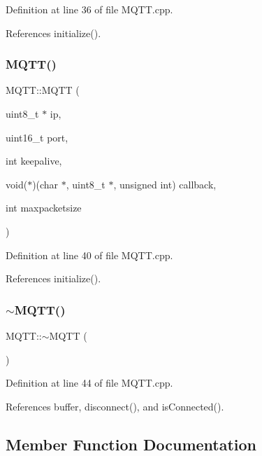 Definition at line 36 of file M\+Q\+T\+T.\+cpp.



References initialize().

\mbox{\label{class_m_q_t_t_a86aa31266ec2193bdd166e9fcd8c9d79}} 
\subsubsection{\texorpdfstring{M\+Q\+T\+T()}{MQTT()}\hspace{0.1cm}{\footnotesize\ttfamily [9/9]}}
{\footnotesize\ttfamily M\+Q\+T\+T\+::\+M\+Q\+TT (\begin{DoxyParamCaption}\item[{uint8\+\_\+t $\ast$}]{ip,  }\item[{uint16\+\_\+t}]{port,  }\item[{int}]{keepalive,  }\item[{void($\ast$)(char $\ast$, uint8\+\_\+t $\ast$, unsigned int)}]{callback,  }\item[{int}]{maxpacketsize }\end{DoxyParamCaption})}



Definition at line 40 of file M\+Q\+T\+T.\+cpp.



References initialize().

\mbox{\label{class_m_q_t_t_a07b8f99719144b5d3bc8d8d817de3e8e}} 
\subsubsection{\texorpdfstring{$\sim$\+M\+Q\+T\+T()}{~MQTT()}}
{\footnotesize\ttfamily M\+Q\+T\+T\+::$\sim$\+M\+Q\+TT (\begin{DoxyParamCaption}{ }\end{DoxyParamCaption})}



Definition at line 44 of file M\+Q\+T\+T.\+cpp.



References buffer, disconnect(), and is\+Connected().



\subsection{Member Function Documentation}
\mbox{\label{class_m_q_t_t_a324c79ef8a1bfaf03d7b3e73b957283b}} 
